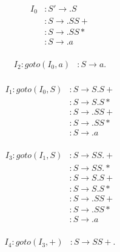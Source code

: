 \documentclass{article}
\begin{document}
\begin{figure}[h!]
\begin{multicols}{2}
\begin{equation*}
\begin{aligned}
I_0 &: S' \rightarrow .S  \\
&: S \rightarrow .SS+ \\
&: S \rightarrow .SS* \\
&: S \rightarrow .a \\
\end{aligned}
\end{equation*}

\begin{equation*}
\begin{aligned}
I_2 : goto(I_0,a) &: S \rightarrow a.  \\
\end{aligned}
\end{equation*}

\begin{equation*}
\begin{aligned}
I_1 : goto(I_0,S) &: S \rightarrow S.S+  \\
&: S \rightarrow S.S*  \\
&: S \rightarrow .SS+  \\
&: S \rightarrow .SS*  \\
&: S \rightarrow .a  \\
\end{aligned}
\end{equation*}

\begin{equation*}
\begin{aligned}
I_3 : goto(I_1,S) &: S \rightarrow SS.+  \\
&: S \rightarrow SS.*  \\
&: S \rightarrow S.S+  \\
&: S \rightarrow S.S*  \\
&: S \rightarrow .SS+  \\
&: S \rightarrow .SS*  \\
&: S \rightarrow .a  \\
\end{aligned}
\end{equation*}

\begin{equation*}
\begin{aligned}
I_4 : goto(I_3,+) &: S \rightarrow SS+.  \\
\end{aligned}
\end{equation*}


\end{multicols}
\end{figure}
\end{document}
